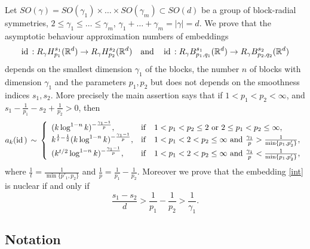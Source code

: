 \documentclass[12pt]{article}
\def\id{\mathop{\rm id \,}\nolimits}
\newcommand{\Rd}{{\mathbb R}^{d}}
\begin{document}
Let $SO(\gamma)= SO(\gamma_1)\times \ldots \times SO(\gamma_m)\subset SO(d)$ be a group of block-radial symmetries, $2\le \gamma_{1}\le \dots \le \gamma_{m}$,  $\gamma_1+\ldots + \gamma_m = |\gamma|= d$. We prove that the asymptotic behaviour approximation numbers  of embeddings 
\begin{equation}\label{int}
 \id: R_{\gamma} H^{s_1}_{p_1}(\Rd)\rightarrow R_{\gamma} H^{s_2}_{p_2}(\Rd) \quad \text{and}\quad \id: R_{\gamma} B^{s_1}_{p_1,q_1}(\Rd)\rightarrow R_{\gamma} B^{s_2}_{p_2,q_2}(\Rd)
 \end{equation}
  depends on the smallest dimension $\gamma_1$ of the blocks, the number $n$ of blocks with dimension $\gamma_1$ and the parameters $p_1, p_2$ but does not depends on the smoothness indices  $s_1,s_2$. More precisely the main assertion says that if $1 < p_1<p_2 < \infty$, and  $s_1-\frac{1}{p_1} -s_2 +\frac{1}{p_2}>0$, then 
	\begin{displaymath}
	a_k(\id)\,\sim\,\left\{ \begin{array}{ll} (k\log^{1-n} k)^{-\frac{\gamma_{1}-1}{p}}, &{\mathrm{if}\quad 1< p_1< p_2\leq2\ \mathrm{or}\ 2\leq p_1<p_2\leq\infty,}\\   k^{\frac{1}{t}-\frac{1}{2}}(k\log^{1-n} k)^{-\frac{\gamma_{1}-1}{p}}, &{\mathrm{if}\quad 1< p_1<2< p_2 \leq\infty \ \mathrm{and}\ \frac{\gamma_{1}}{p}>\frac{1}{\min\{p_1,p'_2\}},}\\
		(k^{t/2}\log^{1-n} k)^{-\frac{\gamma_{1}-1}{p}}, &{\mathrm{if}\quad 1< p_1<2< p_2 \leq\infty \ \mathrm{and}\ \frac{\gamma_{1}}{p}<\frac{1}{\min\{p_1,p'_2\}},} \end{array}\right.
\end{displaymath}
where $\frac{1}{t}=\frac{1}{\min\{p'_1,p_2\}}$  and $\frac{1}{p}=\frac{1}{p_1}-\frac{1}{p_2}$. 
Moreover we prove that the embedding \eqref{int} is nuclear if and only if 
$$\frac{s_1 - s_2}{d}> \frac{1}{p_1}- \frac{1}{p_2}>\frac{1}{\gamma_{1}}.$$ 
 



\subsection*{Notation}
\end{document}
